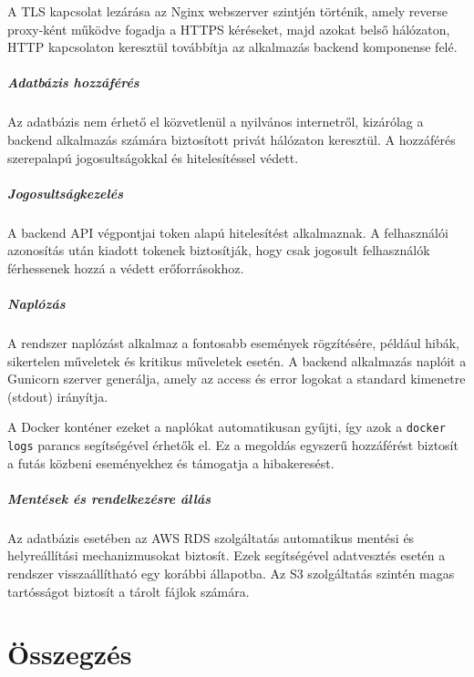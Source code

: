 \documentclass[
]{thesis-ekf}
\theoremstyle{definition}
\theoremstyle{remark}
\begin{document}
A TLS kapcsolat lezárása az Nginx webszerver szintjén történik, amely reverse proxy-ként működve fogadja a HTTPS kéréseket, majd azokat belső hálózaton, HTTP kapcsolaton keresztül továbbítja az alkalmazás backend komponense felé.

\paragraph{Adatbázis hozzáférés}

Az adatbázis nem érhető el közvetlenül a nyilvános internetről, kizárólag a backend alkalmazás számára biztosított privát hálózaton keresztül. A hozzáférés szerepalapú jogosultságokkal és hitelesítéssel védett.

\paragraph{Jogosultságkezelés}

A backend API végpontjai token alapú hitelesítést alkalmaznak. A felhasználói azonosítás után kiadott tokenek biztosítják, hogy csak jogosult felhasználók férhessenek hozzá a védett erőforrásokhoz.

\paragraph{Naplózás}

A rendszer naplózást alkalmaz a fontosabb események rögzítésére, például hibák, sikertelen műveletek és kritikus műveletek esetén. A backend alkalmazás naplóit a Gunicorn szerver generálja, amely az access és error logokat a standard kimenetre (stdout) irányítja.

A Docker konténer ezeket a naplókat automatikusan gyűjti, így azok a \texttt{docker logs} parancs segítségével érhetők el. Ez a megoldás egyszerű hozzáférést biztosít a futás közbeni eseményekhez és támogatja a hibakeresést.

\paragraph{Mentések és rendelkezésre állás}

Az adatbázis esetében az AWS RDS szolgáltatás automatikus mentési és helyreállítási mechanizmusokat biztosít. Ezek segítségével adatvesztés esetén a rendszer visszaállítható egy korábbi állapotba. Az S3 szolgáltatás szintén magas tartósságot biztosít a tárolt fájlok számára.

\chapter{Összegzés}
\end{document}
